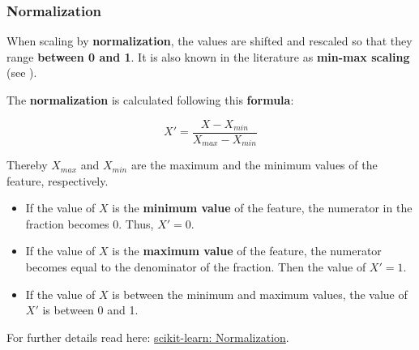 \documentclass [oneside,10pt,a4paper,ngerman,BCOR10mm,headsepline,parindent,final]{scrartcl}
\providecommand{\tightlist}{%
      \setlength{\itemsep}{0pt}\setlength{\parskip}{0pt}}
\begin{document}
    \hypertarget{normalization}{%
\subsubsection{Normalization}\label{normalization}}

When scaling by \textbf{normalization}, the values are shifted and
rescaled so that they range \textbf{between 0 and 1}. It is also known
in the literature as \textbf{min-max scaling} (see
\cite{feature_scaling_2020}).

The \textbf{normalization} is calculated following this
\textbf{formula}:

\[X' = \frac{X - X_{min}}{X_{max} - X_{min}}\]

Thereby \(X_{max}\) and \(X_{min}\) are the maximum and the minimum
values of the feature, respectively.

\begin{itemize}
\tightlist
\item
  If the value of \(X\) is the \textbf{minimum value} of the feature,
  the numerator in the fraction becomes 0. Thus, \(X' = 0\).
\item
  If the value of \(X\) is the \textbf{maximum value} of the feature,
  the numerator becomes equal to the denominator of the fraction. Then
  the value of \(X' = 1\).
\item
  If the value of \(X\) is between the minimum and maximum values, the
  value of \(X'\) is between 0 and 1.
\end{itemize}

For further details read here:
\href{https://scikit-learn.org/stable/modules/preprocessing.html\#normalization}{scikit-learn:
Normalization}.
\end{document}
